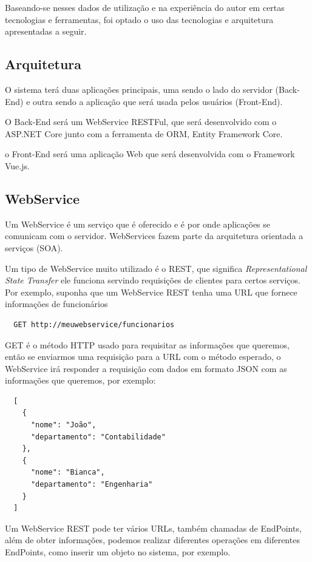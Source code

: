 \documentclass[12pt]{article}
\begin{document}
Baseando-se nesses dados de utilização e na experiência do autor em certas tecnologias e ferramentas,
foi optado o uso das tecnologias e arquitetura apresentadas a seguir.

\subsection{Arquitetura}

O sistema terá duas aplicações principais, uma sendo o lado do servidor (Back-End) e outra sendo
a aplicação que será usada pelos usuários (Front-End).

O Back-End será um WebService RESTFul, que será desenvolvido com o ASP.NET Core
junto com a ferramenta de ORM, Entity Framework Core.

o Front-End será uma aplicação Web que será desenvolvida com o Framework Vue.js.

\subsection{WebService}

Um WebService é um serviço que é oferecido e é por onde aplicações se comunicam com o servidor.
WebServices fazem parte da arquitetura orientada a serviços (SOA).

Um tipo de WebService muito utilizado é o REST, que significa
\emph{Representational State Transfer} ele funciona servindo requisições de clientes
para certos serviços. Por exemplo, suponha que um WebService REST tenha uma URL que fornece
informações de funcionários

\begin{verbatim}
  GET http://meuwebservice/funcionarios
\end{verbatim}

GET é o método HTTP usado para requisitar as informações que queremos, então se enviarmos uma requisição
para a URL com o método esperado, o WebService irá responder a requisição com dados em formato JSON com as informações que queremos, por exemplo:

\begin{verbatim}
  [
    {
      "nome": "João",
      "departamento": "Contabilidade"
    },
    {
      "nome": "Bianca",
      "departamento": "Engenharia"
    }
  ]
\end{verbatim}

Um WebService REST pode ter vários URLs, também chamadas de EndPoints, além de obter informações, podemos realizar
diferentes operações em diferentes EndPoints, como inserir um objeto no sistema, por exemplo.
\end{document}
